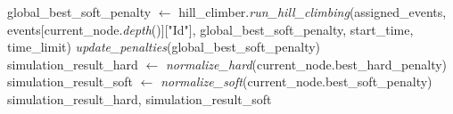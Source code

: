 \begin{algorithm}
\begin{algorithmic}[1]
            \State global\_best\_soft\_penalty $\gets$ hill\_climber.\textit{run\_hill\_climbing}(assigned\_events, 
            \Statex \hspace{3cm} events[current\_node.\textit{depth}()]["Id"], 
            \Statex \hspace{3cm} global\_best\_soft\_penalty, start\_time, time\_limit)
            \State \textit{update\_penalties}(global\_best\_soft\_penalty)
        \EndIf
    \EndIf
    \\
    \State simulation\_result\_hard $\gets$ \textit{normalize\_hard}(current\_node.best\_hard\_penalty)
    \State simulation\_result\_soft $\gets$ \textit{normalize\_soft}(current\_node.best\_soft\_penalty)
    \\
    \State \Return simulation\_result\_hard, simulation\_result\_soft
\EndFunction
\end{algorithmic}
\end{algorithm}

